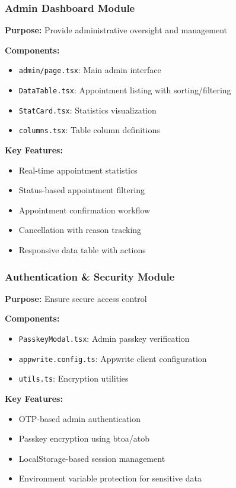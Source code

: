 \documentclass[11pt,a4paper]{article}
\begin{document}
\subsubsection{Admin Dashboard Module}
\textbf{Purpose:} Provide administrative oversight and management

\textbf{Components:}
\begin{itemize}
    \item \texttt{admin/page.tsx}: Main admin interface
    \item \texttt{DataTable.tsx}: Appointment listing with sorting/filtering
    \item \texttt{StatCard.tsx}: Statistics visualization
    \item \texttt{columns.tsx}: Table column definitions
\end{itemize}

\textbf{Key Features:}
\begin{itemize}
    \item Real-time appointment statistics
    \item Status-based appointment filtering
    \item Appointment confirmation workflow
    \item Cancellation with reason tracking
    \item Responsive data table with actions
\end{itemize}

\subsubsection{Authentication \& Security Module}
\textbf{Purpose:} Ensure secure access control

\textbf{Components:}
\begin{itemize}
    \item \texttt{PasskeyModal.tsx}: Admin passkey verification
    \item \texttt{appwrite.config.ts}: Appwrite client configuration
    \item \texttt{utils.ts}: Encryption utilities
\end{itemize}

\textbf{Key Features:}
\begin{itemize}
    \item OTP-based admin authentication
    \item Passkey encryption using btoa/atob
    \item LocalStorage-based session management
    \item Environment variable protection for sensitive data
\end{itemize}
\end{document}
